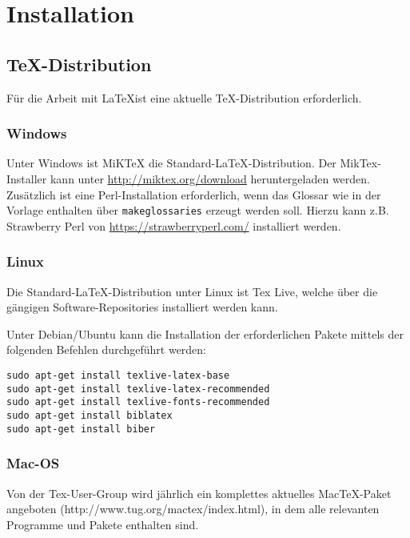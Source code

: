 \section{Installation}
\label{instal}

\subsection{TeX-Distribution}

Für die Arbeit mit \LaTeX ist eine aktuelle TeX-Distribution erforderlich. 

\subsubsection{Windows}

Unter Windows ist MiKTeX die Standard-{\LaTeX}-Distribution. Der MikTex-Installer kann unter \url{http://miktex.org/download} heruntergeladen werden. Zusätzlich ist eine Perl-Installation erforderlich, wenn das Glossar wie in der Vorlage enthalten über \texttt{makeglossaries} erzeugt werden soll. Hierzu kann z.B. Strawberry Perl von \url{https://strawberryperl.com/} installiert werden.

\subsubsection{Linux}

Die Standard-{\LaTeX}-Distribution unter Linux ist Tex Live, welche über die gängigen Software-Repositories installiert werden kann.

Unter Debian/Ubuntu kann die Installation der erforderlichen Pakete mittels der folgenden Befehlen durchgeführt werden:

\texttt{sudo apt-get install texlive-latex-base}\\
\texttt{sudo apt-get install texlive-latex-recommended}\\
\texttt{sudo apt-get install texlive-fonts-recommended}\\
\texttt{sudo apt-get install biblatex}\\
\texttt{sudo apt-get install biber}

\subsubsection{Mac-OS}
Von der Tex-User-Group wird jährlich ein komplettes aktuelles Mac{\TeX}-Paket angeboten (http://www.tug.org/mactex/index.html), in dem alle relevanten Programme und Pakete enthalten sind.

